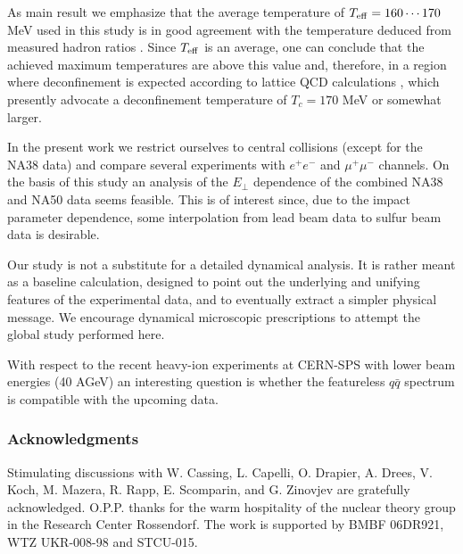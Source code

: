 As main result we emphasize that the average temperature of 
$T_{\rm eff} = 160 \cdots 170$ MeV used in this study  
is in good agreement with the
temperature deduced from measured hadron ratios \cite{abundances}.
Since $T_{\rm eff}$ is an average, one can conclude that the achieved
maximum temperatures are above this value and, therefore, in a region
where deconfinement is expected according to lattice QCD
calculations \cite{lattice_QCD}, which presently advocate
a deconfinement temperature of $T_c = 170$ MeV or somewhat larger. 

In the present work we restrict ourselves to central collisions
(except for the NA38 data)
and compare several experiments with $e^+ e^-$ and $\mu^+ \mu^-$
channels.
On the basis of this study  an analysis of the $E_\perp$ dependence of the 
combined NA38 and NA50 data seems feasible. 
This is of interest since, due to the impact parameter dependence,
some interpolation from lead beam data to sulfur beam data 
is desirable. 

Our study is not a substitute for a detailed dynamical
analysis. It is rather meant as a baseline calculation, designed to
point out the underlying and unifying features of the experimental
data, and to eventually extract a simpler physical message. We 
encourage dynamical microscopic prescriptions to attempt the global
study performed here. 

With respect to the recent heavy-ion experiments at CERN-SPS with
lower beam energies (40 AGeV) an interesting question is whether
the featureless $q \bar q$ spectrum is compatible with the upcoming
data.
 
\subsubsection*{Acknowledgments}
Stimulating discussions with 
W. Cassing,
L. Capelli,
O. Drapier,
A. Drees,
V. Koch,
M. Mazera,
R. Rapp,
E. Scomparin, and
G. Zinovjev are gratefully
acknowledged.
O.P.P. thanks for the warm hospitality of the nuclear theory group
in the Research Center Rossendorf.
The work is supported by 
BMBF 06DR921,
WTZ UKR-008-98 and 
STCU-015.

